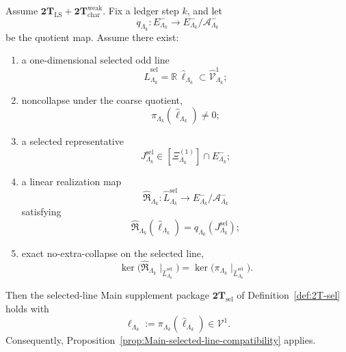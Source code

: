 \begin{theorem}
\label{thm:Main-selected-line-contract-refined}
Assume \(\mathbf{2T}_{\mathrm{LS}}+\mathbf{2T}_{\mathrm{char}}^{\mathrm{weak}}\).
Fix a ledger step \(k\), and let
\[
q_{\Lambda_k}:E^-_{\Lambda_k}\longrightarrow E^-_{\Lambda_k}/\mathcal A^-_{\Lambda_k}
\]
be the quotient map.
Assume there exist:
\begin{enumerate}[label=\textnormal{(\alph*)},leftmargin=*,itemsep=0.35em]
\item a one-dimensional selected odd line
  \[
  \widehat L^{\mathrm{sel}}_{\Lambda_k}
  =
  \mathbb R\,\widehat\ell_{\Lambda_k}
  \subset \widehat{\mathcal V}^1_{\Lambda_k};
  \]
\item noncollapse under the coarse quotient,
  \[
  \pi_{\Lambda_k}(\widehat\ell_{\Lambda_k})\neq 0;
  \]
\item a selected representative
  \[
  J^{\mathrm{sel}}_{\Lambda_k}\in[\Xi^{(1)}_{\Lambda_k}]\cap E^-_{\Lambda_k};
  \]
\item a linear realization map
  \[
  \widehat{\mathfrak R}_{\Lambda_k}:\widehat L^{\mathrm{sel}}_{\Lambda_k}
  \longrightarrow
  E^-_{\Lambda_k}/\mathcal A^-_{\Lambda_k}
  \]
  satisfying
  \[
  \widehat{\mathfrak R}_{\Lambda_k}(\widehat\ell_{\Lambda_k})
  =
  q_{\Lambda_k}(J^{\mathrm{sel}}_{\Lambda_k});
  \]
\item exact no-extra-collapse on the selected line,
  \[
  \ker\!\bigl(\widehat{\mathfrak R}_{\Lambda_k}\!\mid_{\widehat L^{\mathrm{sel}}_{\Lambda_k}}\bigr)
  =
  \ker\!\bigl(\pi_{\Lambda_k}\!\mid_{\widehat L^{\mathrm{sel}}_{\Lambda_k}}\bigr).
  \]
\end{enumerate}
Then the selected-line Main supplement package
\(\mathbf{2T}_{\mathrm{sel}}\) of Definition~\ref{def:2T-sel} holds with
\[
\ell_{\Lambda_k}
:=
\pi_{\Lambda_k}(\widehat\ell_{\Lambda_k})
\in\mathcal V^1.
\]
Consequently, Proposition~\ref{prop:Main-selected-line-compatibility} applies.
\end{theorem}

